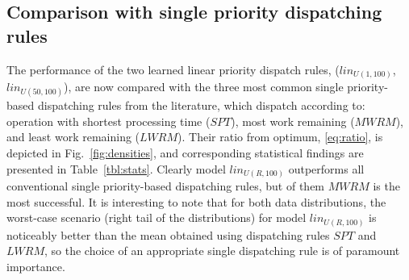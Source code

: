 \documentclass[10pt]{llncs}
\begin{document}
\subsection{Comparison with single priority dispatching rules}
The performance of the two learned linear priority dispatch rules, ($lin_{U(1,100)}$, $lin_{U(50,100)}$), are now compared with the three most common single priority-based dispatching rules from the literature, which dispatch according to: operation with shortest processing time ($SPT$), most work remaining ($MWRM$), and least work remaining ($LWRM$). 
Their ratio from optimum, \eqref{eq:ratio}, is depicted in Fig.~\ref{fig:densities}, and corresponding statistical findings are presented in Table~\ref{tbl:stats}. Clearly model $lin_{U(R,100)}$ outperforms all conventional single priority-based dispatching rules, but of them $MWRM$ is the most successful. It is interesting to note that for both data distributions, the worst-case scenario (right tail of the distributions) for model $lin_{U(R,100)}$ is noticeably better than the mean obtained using dispatching rules $SPT$ and $LWRM$, so the choice of an appropriate single dispatching rule is of paramount importance.
\end{document}
